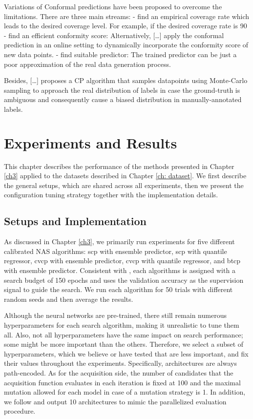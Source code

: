 \documentclass[a4paper,oneside,bibliography=totoc]{scrbook}
\begin{document}
Variations of Conformal predictions have been proposed to overcome the limitations. There are three main streams:
- find an empirical coverage rate which leads to the desired coverage level. For example, if the desired coverage rate is 90%
- find an efficient conformity score: Alternatively, […] apply the conformal prediction in an online setting to dynamically incorporate the conformity score of new data points.
- find suitable predictor: The trained predictor can be just a poor approximation of the real data generation process.

Besides, […] proposes a CP algorithm that samples datapoints using Monte-Carlo sampling to approach the real distribution of labels in case the ground-truth is ambiguous and consequently cause a biased distribution in manually-annotated labels.





\chapter{Experiments and Results}
This chapter describes the performance of the methods presented in Chapter \ref{ch3}  applied to the datasets described in Chapter \ref{ch: dataset}. We first describe the general setups, which are shared across all experiments, then we present the configuration tuning strategy together with the implementation details. 

\section{Setups and Implementation}
As discussed in Chapter \ref{ch3}, we primarily run experiments for five different calibrated NAS algorithms: \gls{scp} with ensemble predictor, \gls{scp} with quantile regressor, \gls{cvcp} with ensemble predictor, \gls{cvcp} with quantile regressor, and \gls{btcp} with ensemble predictor. Consistent with \cite{white2019bananas}, each algorithms is assigned with a search budget of 150 epochs and uses the validation accuracy as the supervision signal to guide the search. We run each algorithm for 50 trials with different random seeds and then average the results.

Although the neural networks are pre-trained, there still remain numerous hyperparameters for each search algorithm, making it unrealistic to tune them all. Also, not all hyperparameters have the same impact on search performance; some might be more important than the others. Therefore, we select a subset of hyperparameters, which we believe or have tested that are less important, and fix their values throughout the experiments. Specifically, architectures are always path-encoded. As for the acquisition side, the number of candidates that the acquisition function evaluates in each iteration is fixed at 100 and the maximal mutation allowed for each model in case of a mutation strategy is 1. In addition, we follow \cite{white2019bananas} and output 10 architectures to mimic the parallelized evaluation procedure.
\end{document}
